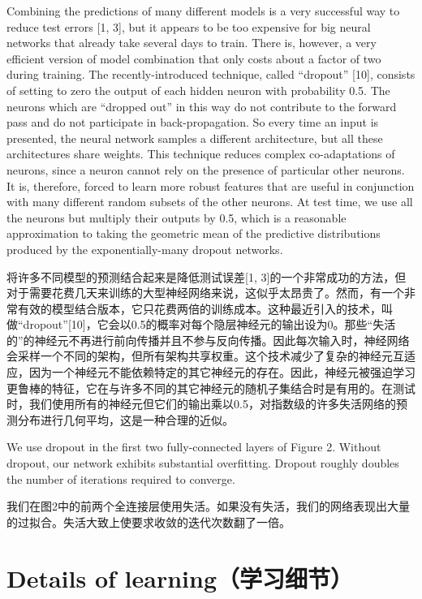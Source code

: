 \documentclass[12pt,a4paper,UTF8,twoside]{book}
\begin{document}
Combining the predictions of many different models is a very successful way to reduce test errors {[}1, 3{]}, but it appears to be too expensive for big neural networks that already take several days to train. There is, however, a very efficient version of model combination that only costs about a factor of two during training. The recently-introduced technique, called ``dropout'' {[}10{]}, consists of setting to zero the output of each hidden neuron with probability 0.5. The neurons which are ``dropped out'' in this way do not contribute to the forward pass and do not participate in back-propagation. So every time an input is presented, the neural network samples a different architecture, but all these architectures share weights. This technique reduces complex co-adaptations of neurons, since a neuron cannot rely on the presence of particular other neurons. It is, therefore, forced to learn more robust features that are useful in conjunction with many different random subsets of the other neurons. At test time, we use all the neurons but multiply their outputs by 0.5, which is a reasonable approximation to taking the geometric mean of the predictive distributions produced by the exponentially-many dropout networks.

将许多不同模型的预测结合起来是降低测试误差{[}1, 3{]}的一个非常成功的方法，但对于需要花费几天来训练的大型神经网络来说，这似乎太昂贵了。然而，有一个非常有效的模型结合版本，它只花费两倍的训练成本。这种最近引入的技术，叫做``dropout''{[}10{]}，它会以0.5的概率对每个隐层神经元的输出设为0。那些``失活的''的神经元不再进行前向传播并且不参与反向传播。因此每次输入时，神经网络会采样一个不同的架构，但所有架构共享权重。这个技术减少了复杂的神经元互适应，因为一个神经元不能依赖特定的其它神经元的存在。因此，神经元被强迫学习更鲁棒的特征，它在与许多不同的其它神经元的随机子集结合时是有用的。在测试时，我们使用所有的神经元但它们的输出乘以0.5，对指数级的许多失活网络的预测分布进行几何平均，这是一种合理的近似。

We use dropout in the first two fully-connected layers of Figure 2. Without dropout, our network exhibits substantial overfitting. Dropout roughly doubles the number of iterations required to converge.

我们在图2中的前两个全连接层使用失活。如果没有失活，我们的网络表现出大量的过拟合。失活大致上使要求收敛的迭代次数翻了一倍。

\hypertarget{details-of-learningux5b66ux4e60ux7ec6ux8282}{%
\section{Details of learning（学习细节）}\label{details-of-learningux5b66ux4e60ux7ec6ux8282}}
\end{document}
